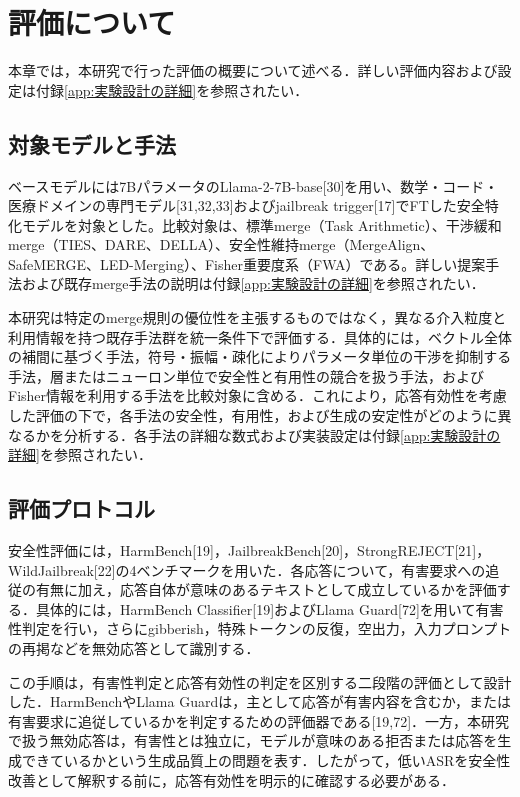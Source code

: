 \documentclass{article}
\begin{document}
\section{評価について}
本章では，本研究で行った評価の概要について述べる．詳しい評価内容および設定は付録\ref{app:実験設計の詳細}を参照されたい．
\subsection{対象モデルと手法}

ベースモデルには7BパラメータのLlama-2-7B-base[30]を用い、数学・コード・医療ドメインの専門モデル[31,32,33]およびjailbreak trigger[17]でFTした安全特化モデルを対象とした。比較対象は、標準merge（Task Arithmetic）、干渉緩和merge（TIES、DARE、DELLA）、安全性維持merge（MergeAlign、SafeMERGE、LED-Merging）、Fisher重要度系（FWA）である。詳しい提案手法および既存merge手法の説明は付録\ref{app:実験設計の詳細}を参照されたい．

本研究は特定のmerge規則の優位性を主張するものではなく，異なる介入粒度と利用情報を持つ既存手法群を統一条件下で評価する．具体的には，ベクトル全体の補間に基づく手法，符号・振幅・疎化によりパラメータ単位の干渉を抑制する手法，層またはニューロン単位で安全性と有用性の競合を扱う手法，およびFisher情報を利用する手法を比較対象に含める．これにより，応答有効性を考慮した評価の下で，各手法の安全性，有用性，および生成の安定性がどのように異なるかを分析する．各手法の詳細な数式および実装設定は付録\ref{app:実験設計の詳細}を参照されたい．

\subsection{評価プロトコル}
安全性評価には，HarmBench[19]，JailbreakBench[20]，StrongREJECT[21]，WildJailbreak[22]の4ベンチマークを用いた．各応答について，有害要求への追従の有無に加え，応答自体が意味のあるテキストとして成立しているかを評価する．具体的には，HarmBench Classifier[19]およびLlama Guard[72]を用いて有害性判定を行い，さらにgibberish，特殊トークンの反復，空出力，入力プロンプトの再掲などを無効応答として識別する．

この手順は，有害性判定と応答有効性の判定を区別する二段階の評価として設計した．HarmBenchやLlama Guardは，主として応答が有害内容を含むか，または有害要求に追従しているかを判定するための評価器である[19,72]．一方，本研究で扱う無効応答は，有害性とは独立に，モデルが意味のある拒否または応答を生成できているかという生成品質上の問題を表す．したがって，低いASRを安全性改善として解釈する前に，応答有効性を明示的に確認する必要がある．
\end{document}
